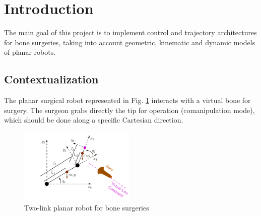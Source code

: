 \section{Introduction}

The main goal of this project is to implement control and trajectory architectures for bone surgeries, taking into account geometric, kinematic and dynamic models of planar robots.

\subsection{Contextualization}

The planar surgical robot represented in Fig. \ref{fig:enunciado} interacts with a virtual bone for surgery. The surgeon grabs directly the tip for operation (comanipulation mode), which should be done along a specific Cartesian direction. 

\begin{figure}[H]
    \centering
    \includegraphics[width=0.49\textwidth]{imgs/foto_enunciado.png}
    \caption{Two-link planar robot for bone surgeries}
    \label{fig:enunciado}
\end{figure}































